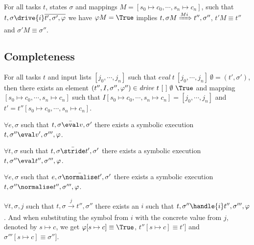 \begin{lemma}
  \label{lem:sounddrive}

  For all tasks $t$, states $\sigma$ and mappings $M=[s_0\mapsto c_0,\cdots,s_n\mapsto c_n]$,
  such that $t,\sigma\drive{i} \overline{t',\sigma',\phi}$
  we have $\phi M = \True$ implies
  $t,\sigma M \xRightarrow[]{M i} t'',\sigma''$, $t'M \equiv t''$ and $\sigma' M \equiv \sigma''$.
\end{lemma}



\subsection{Completeness}



\begin{theorem}
For all tasks $t$ and input lists $[j_0,\cdots,j_n]$ such that $\mathit{eval}\ t\ [j_0,\cdots,j_n]\ \emptyset = (t',\sigma')$,
then there exists an element $(t'',I,\sigma'',\phi'')\in \mathit{drive}\ t\ [\ ]\ \emptyset\ \True$ and mapping $[s_0\mapsto c_0,\cdots,s_n\mapsto c_n]$ such that
$I[s_0\mapsto c_0,\cdots,s_n\mapsto c_n]=[j_0,\cdots,j_n]$ and $t'=t''[s_0\mapsto c_0,\cdots,s_n\mapsto c_n]$.
  \label{thm:complete}
\end{theorem}


\begin{lemma}
  \label{lem:completeEval}
  $\forall e,\sigma$ such that $t,\sigma \bar{\eval}v,\sigma'$
  there exists a symbolic execution $t,\sigma''\eval v',\sigma''',\phi$.
\end{lemma}


\begin{lemma}
  \label{lem:completeStride}
  $\forall t,\sigma$ such that $t,\sigma \bar{\stride}t',\sigma'$
  there exists a symbolic execution $t,\sigma''\eval t'',\sigma''',\phi$.
\end{lemma}


\begin{lemma}
  \label{lem:completeNormalise}
  $\forall e,\sigma$ such that $e,\sigma \bar{\normalise}t',\sigma'$
  there exists a symbolic execution $t,\sigma''\normalise t'',\sigma''',\phi$.
\end{lemma}


\begin{lemma}
  \label{lem:completeHandle}
  $\forall t,\sigma,j$ such that $t,\sigma \xrightarrow[]{j} t'',\sigma''$
  there exists an $i$ such that $t,\sigma''\handle{i} t'',\sigma''',\phi$. And when substituting the symbol from $i$ with the concrete value from $j$, denoted by $s\mapsto c$, we get $\phi[s\mapsto c]\equiv\True$, $t''[s\mapsto c]\equiv t']$ and $\sigma'''[s\mapsto c]\equiv\sigma'']$.
\end{lemma}


\begin{lemma}
  \label{lem:completeDrive}
\end{lemma}

